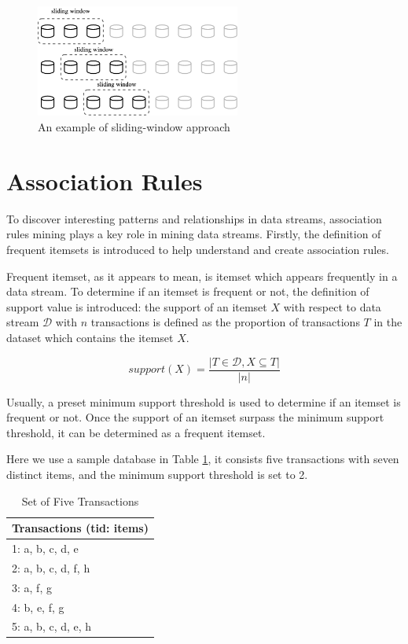\begin{figure}[H]
    \centering
    \includegraphics[width=0.6\textwidth]{RelatedWorks/window.png}
    \caption{An example of sliding-window approach}
    \label{fig:abrupt}
\end{figure}

\section{Association Rules} \label{sec:2.2}
To discover interesting patterns and relationships in data streams, association rules mining plays a key role in mining data streams. Firstly, the definition of frequent itemsets is introduced to help understand and create association rules.

\begin{definition}
\label{freqitemset}
Frequent itemset, as it appears to mean, is itemset which appears frequently in a data stream. To determine if an itemset is frequent or not, the definition of support value is introduced: the support of an itemset $X$ with respect to data stream $\mathcal{D}$ with $n$ transactions is defined as the proportion of transactions $T$ in the dataset which contains the itemset $X$.
\end{definition}

\[ support(X)=\frac{|T \in \mathcal{D}, X \subseteq T|}{|n|} \]

Usually, a preset minimum support threshold is used to determine if an itemset is frequent or not. Once the support of an itemset surpass the minimum support threshold, it can be determined as a frequent itemset.

Here we use a sample database in Table \ref{tb:tidlist}, it consists five transactions with seven distinct items, and the minimum support threshold is set to 2.

\begin{table}[h!]
\caption{Set of Five Transactions}
\label{tb:tidlist}
\centering
 \begin{tabular}{p{6cm}} 
 \hline\hline
 \multicolumn{1}{c}{Transactions (tid: items)}\\
 \hline
 1: a, b, c, d, e \\ 
 2: a, b, c, d, f, h \\
 3: a, f, g \\
 4: b, e, f, g \\
 5: a, b, c, d, e, h \\
 \hline
\end{tabular}
\end{table}

